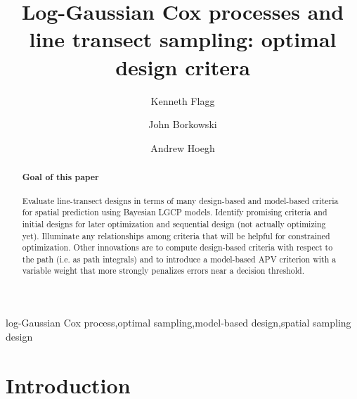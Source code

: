 \documentclass[review]{elsarticle}
\begin{document}
\begin{frontmatter}

\title{Log-Gaussian Cox processes and line transect sampling: optimal design critera}

\author[msuaddr]{Kenneth Flagg}

\author[msuaddr]{John Borkowski}
\author[msuaddr]{Andrew Hoegh}

\address[msuaddr]{Department of Mathematical Sciences, Montana State University, Bozeman, MT 59717}

\begin{abstract}

\paragraph{Goal of this paper} Evaluate line-transect designs in terms of many
design-based and model-based criteria for spatial prediction using Bayesian
LGCP models. Identify promising criteria and initial designs for later
optimization and sequential design (not actually optimizing yet). Illuminate
any relationships among criteria that will be helpful for constrained
optimization. Other innovations are to compute design-based criteria with
respect to the path (i.e. as path integrals) and to introduce a model-based APV
criterion with a variable weight that more strongly penalizes errors near a
decision threshold.

\end{abstract}

\begin{keyword}
log-Gaussian Cox process\sep optimal sampling\sep model-based design\sep spatial sampling design
\end{keyword}

\end{frontmatter}

\linenumbers



\section{Introduction}
\end{document}
